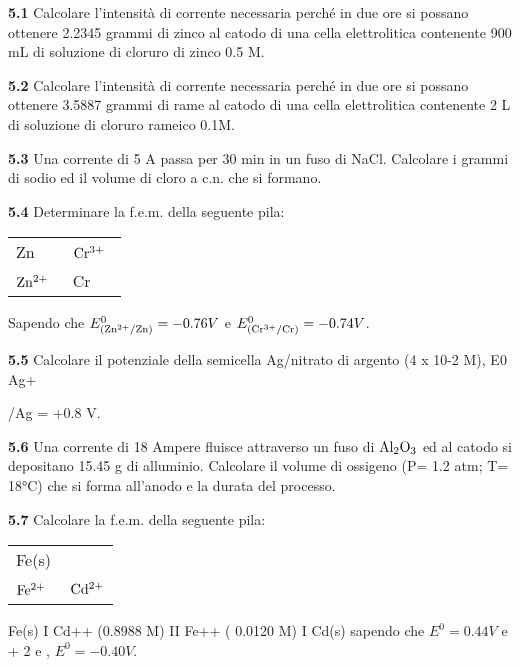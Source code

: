 \textbf{5.1} Calcolare l’intensità di corrente necessaria perché in due ore si possano ottenere 2.2345 grammi di zinco al catodo di una cella elettrolitica contenente 900 mL di soluzione di cloruro di zinco 0.5 M.

\vspace{0.2cm}\textbf{5.2} Calcolare l’intensità di corrente necessaria perché in due ore si possano ottenere 3.5887 grammi di rame al catodo di una cella elettrolitica contenente 2 L di soluzione di cloruro rameico 0.1M.

\vspace{0.2cm}\textbf{5.3} Una corrente di 5 A passa per 30 min in un fuso di NaCl. Calcolare i grammi di sodio ed il
volume di cloro a c.n. che si formano.

\vspace{0.2cm}\textbf{5.4} Determinare la f.e.m. della seguente pila:

\begin{center}
    \begin{tabular}{|p{3.7cm}||p{3.7cm}|}
         Zn & $\rm Cr^{3+}$ \, \\[0.5ex]
         $\rm Zn^{2+}$ \,  & Cr\\[0.5ex]
    \end{tabular}
\end{center}

Sapendo che $E^{0}_{(\rm Zn^{2+}/Zn)}=-0.76V$ e $E^{0}_{(\rm Cr^{3+}/Cr)}=-0.74V$.

\vspace{0.2cm}\textbf{5.5} Calcolare il potenziale della semicella Ag/nitrato di argento (4 x 10-2 M), E0 Ag+

/Ag = +0.8 V.

\vspace{0.2cm}\textbf{5.6} Una corrente di 18 Ampere fluisce attraverso un fuso di $\rm Al_2O_3$ ed al catodo si depositano 15.45 g
di alluminio. Calcolare il volume di ossigeno (P= 1.2 atm; T= 18°C) che si forma all’anodo e la
durata del processo.

\vspace{0.2cm}\textbf{5.7} Calcolare la f.e.m. della seguente pila:

\begin{center}
    \begin{tabular}{|p{3.7cm}||p{3.7cm}|}
         Fe(s) &  \, \\[0.5ex]
         $\rm Fe^{2+}$ \,  & $\rm Cd^{2+}$\\[0.5ex]
    \end{tabular}
\end{center}

Fe(s) I Cd++ (0.8988 M) II Fe++ ( 0.0120 M) I Cd(s)
sapendo che   $E^0=0.44V$ e  + 2 e , $E^0=-0.40V$.

